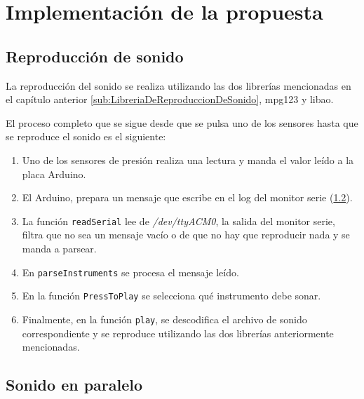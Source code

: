 
\chapter{Implementación de la propuesta}
\label{cha:Implementacion}

    \section{Reproducción de sonido} %
    \label{sec:ReproduccionDeSonido}

        La reproducción del sonido se realiza utilizando las dos librerías mencionadas en el capítulo
        anterior \ref{sub:LibreriaDeReproduccionDeSonido}, mpg123 y libao.

        El proceso completo que se sigue desde que se pulsa uno de los sensores hasta que se reproduce el sonido es el
        siguiente:
        \begin{enumerate}
            \item Uno de los sensores de presión realiza una lectura y manda el valor leído a la placa Arduino.
            \item El Arduino, prepara un mensaje que escribe en el log del monitor serie (\ref{sec:SonidoEnParalelo}).
            \item La función \texttt{readSerial} lee de \textit{/dev/ttyACM0}, la salida del monitor serie, filtra que
            no sea un mensaje vacío o de que no hay que reproducir nada y se manda a parsear.
            \item En \texttt{parseInstruments} se procesa el mensaje leído.
            \item En la función \texttt{PressToPlay} se selecciona qué instrumento debe sonar.
            \item Finalmente, en la función \texttt{play}, se descodifica el archivo de sonido correspondiente y se
            reproduce utilizando las dos librerías anteriormente mencionadas.
        \end{enumerate}


    \section{Sonido en paralelo} %
    \label{sec:SonidoEnParalelo}

